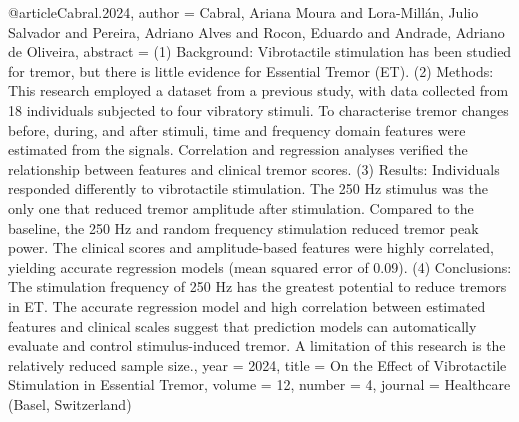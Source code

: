 
@article{Cabral.2024,
 author = {Cabral, Ariana Moura and Lora-Mill{\'a}n, Julio Salvador and Pereira, Adriano Alves and Rocon, Eduardo and Andrade, Adriano de Oliveira},
 abstract = {(1) Background: Vibrotactile stimulation has been studied for tremor, but there is little evidence for Essential Tremor (ET). (2) Methods: This research employed a dataset from a previous study, with data collected from 18 individuals subjected to four vibratory stimuli. To characterise tremor changes before, during, and after stimuli, time and frequency domain features were estimated from the signals. Correlation and regression analyses verified the relationship between features and clinical tremor scores. (3) Results: Individuals responded differently to vibrotactile stimulation. The 250 Hz stimulus was the only one that reduced tremor amplitude after stimulation. Compared to the baseline, the 250 Hz and random frequency stimulation reduced tremor peak power. The clinical scores and amplitude-based features were highly correlated, yielding accurate regression models (mean squared error of 0.09). (4) Conclusions: The stimulation frequency of 250 Hz has the greatest potential to reduce tremors in ET. The accurate regression model and high correlation between estimated features and clinical scales suggest that prediction models can automatically evaluate and control stimulus-induced tremor. A limitation of this research is the relatively reduced sample size.},
 year = {2024},
 title = {{On the Effect of Vibrotactile Stimulation in Essential Tremor}},
 volume = {12},
 number = {4},
 journal = {{Healthcare (Basel, Switzerland)}}
}


